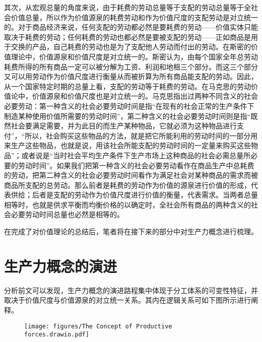 其次，从宏观总量的角度来说，由于耗费的劳动总量等于支配的劳动总量等于全社会价值总量\cite[71-72]{CaiJiMingLunHaoFeiDeLaoDongYuGouMaiDeLaoDongZaiJieZhiLiLunZhongDeZuoYong2022}，所以作为价值源泉的耗费劳动和作为价值尺度的支配劳动是对立统一的。对于商品经济来说，任何支配的劳动都必然是要耗费的劳动——价值实体只能取决于耗费的劳动；任何耗费的劳动也都必然是要被支配的劳动——正如商品是用于交换的产品，自己耗费的劳动也是为了支配他人劳动而付出的劳动。在斯密的价值理论中，价值源泉和价值尺度是对立统一的。斯密认为，由每个国家全年总劳动耗费所得的所有商品一定可以被分解为工资、利润和地租三个部分。而这三个部分又可以用劳动作为价值尺度进行衡量从而被折算为所有商品能支配的劳动。因此，从一个国家特定时期的总量上看，支配的劳动等于耗费的劳动。\cite[41-48]{YaDang*SiMiGuoFuLun2015}在马克思的劳动价值论中，价值源泉和价值尺度也是对立统一的。马克思指出过两种不同含义的社会必要劳动\cite[29]{CaiJiMingBiYaoLaoDongIHeBiYaoLaoDongIIGongTongJueDingJieZhi1995}\cite[19]{GuShuTangDuiJieZhiJueDingHeJieZhiGuiLuDeZaiTanTao1982}：第一种含义的社会必要劳动时间是指“在现有的社会正常的生产条件下制造某种使用价值所需要的劳动时间”\cite[52]{ZhongGongZhongYangMaKeSiEnGeSiLieNingSiDaLinZhuZuoBianYiJuMaKeSiEnGeSiWenJiDi5Juan2009}，第二种含义的社会必要劳动时间则是指“既然社会要满足需要，并为此目的而生产某种物品，它就必须为这种物品进行支付”，“所以，社会购买这些物品的方法，就是把它所能利用的劳动时间的一部分用来生产这些物品，也就是说，用该社会所能支配的劳动时间的一定量来购买这些物品”\cite[208]{ZhongGongZhongYangMaKeSiEnGeSiLieNingSiDaLinZhuZuoBianYiJuMaKeSiEnGeSiWenJiDi7Juan2009}；或者说是“当时社会平均生产条件下生产市场上这种商品的社会必需总量所必要的劳动时间”\cite[722]{ZhongGongZhongYangMaKeSiEnGeSiLieNingSiDaLinZhuZuoBianYiJuMaKeSiEnGeSiWenJiDi7Juan2009}。如果我们把第一种含义的社会必要劳动看作在商品生产中总耗费的劳动，把第二种含义的社会必要劳动时间看作为满足社会对某种商品的需求而被商品所支配的总劳动。那么前者是耗费的劳动作为价值的源泉进行价值的形成，代表供给；后者是支配的劳动作为价值尺度进行价值的衡量，代表需求。当两者总量相等时，也就是供求平衡而均衡价格的以确定时，全社会所有商品的两种含义的社会必要劳动时间总量也必然是相等的。\cite[72]{CaiJiMingLunHaoFeiDeLaoDongYuGouMaiDeLaoDongZaiJieZhiLiLunZhongDeZuoYong2022}

在完成了对价值理论的总结后，笔者将在接下来的部分中对生产力概念进行梳理。

\section{生产力概念的演进}

分析前文可以发现，生产力概念的演进路程集中体现于分工体系的可变性特征，并取决于价值尺度与价值源泉的对立统一关系。其内在逻辑关系可如下图所示进行阐释。

\begin{figure}
    \texttt{[image: figures/The Concept of Productive forces.drawio.pdf]}
\end{figure}
